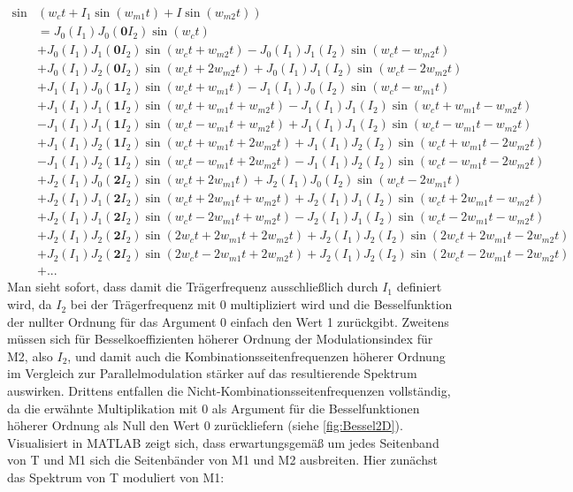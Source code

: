 \begin{equation}
\begin{split}
\sin&(w_ct + I_1\sin(w_{m1}t) + I\sin(w_{m2}t)) \\
&= J_0(I_1)J_0(\mathbf{0}I_2)\sin(w_ct) \\
&+ J_0(I_1)J_1(\mathbf{0}I_2)\sin(w_ct + w_{m2}t) - J_0(I_1)J_1(I_2)\sin(w_ct - w_{m2}t) \\
&+ J_0(I_1)J_2(\mathbf{0}I_2)\sin(w_ct + 2w_{m2}t) + J_0(I_1)J_1(I_2)\sin(w_ct - 2w_{m2}t) \\
&+ J_1(I_1)J_0(\mathbf{1}I_2)\sin(w_ct + w_{m1}t) - J_1(I_1)J_0(I_2)\sin(w_ct - w_{m1}t) \\
&+ J_1(I_1)J_1(\mathbf{1}I_2)\sin(w_ct + w_{m1}t + w_{m2}t) - J_1(I_1)J_1(I_2)\sin(w_ct + w_{m1}t - w_{m2}t) \\
&- J_1(I_1)J_1(\mathbf{1}I_2)\sin(w_ct - w_{m1}t + w_{m2}t) + J_1(I_1)J_1(I_2)\sin(w_ct - w_{m1}t - w_{m2}t) \\
&+ J_1(I_1)J_2(\mathbf{1}I_2)\sin(w_ct + w_{m1}t + 2w_{m2}t) + J_1(I_1)J_2(I_2)\sin(w_ct + w_{m1}t - 2w_{m2}t) \\
&- J_1(I_1)J_2(\mathbf{1}I_2)\sin(w_ct - w_{m1}t + 2w_{m2}t) - J_1(I_1)J_2(I_2)\sin(w_ct - w_{m1}t - 2w_{m2}t) \\
&+ J_2(I_1)J_0(\mathbf{2}I_2)\sin(w_ct + 2w_{m1}t) + J_2(I_1)J_0(I_2)\sin(w_ct - 2w_{m1}t) \\
&+ J_2(I_1)J_1(\mathbf{2}I_2)\sin(w_ct + 2w_{m1}t + w_{m2}t) + J_2(I_1)J_1(I_2)\sin(w_ct + 2w_{m1}t - w_{m2}t) \\
&+ J_2(I_1)J_1(\mathbf{2}I_2)\sin(w_ct - 2w_{m1}t + w_{m2}t) - J_2(I_1)J_1(I_2)\sin(w_ct - 2w_{m1}t - w_{m2}t) \\
&+ J_2(I_1)J_2(\mathbf{2}I_2)\sin(2w_ct + 2w_{m1}t + 2w_{m2}t) + J_2(I_1)J_2(I_2)\sin(2w_ct + 2w_{m1}t - 2w_{m2}t) \\
&+ J_2(I_1)J_2(\mathbf{2}I_2)\sin(2w_ct - 2w_{m1}t + 2w_{m2}t) + J_2(I_1)J_2(I_2)\sin(2w_ct - 2w_{m1}t - 2w_{m2}t) \\
&+ ... 
\end{split}
\end{equation}
Man sieht sofort, dass damit die Trägerfrequenz ausschließlich durch $ I_1 $ definiert wird, da $ I_2 $ bei der Trägerfrequenz mit 0 multipliziert wird und die Besselfunktion der nullter Ordnung für das Argument 0 einfach den Wert 1 zurückgibt. Zweitens müssen sich für Besselkoeffizienten höherer Ordnung der Modulationsindex für M2, also $ I_2 $, und damit auch die Kombinationsseitenfrequenzen höherer Ordnung im Vergleich zur Parallelmodulation stärker auf das resultierende Spektrum auswirken. Drittens entfallen die Nicht-Kombinationsseitenfrequenzen vollständig, da die erwähnte Multiplikation mit 0 als Argument für die Besselfunktionen höherer Ordnung als Null den Wert 0 zurückliefern (siehe \ref{fig:Bessel2D}). Visualisiert in MATLAB zeigt sich, dass erwartungsgemäß um jedes Seitenband von T und M1 sich die Seitenbänder von M1 und M2 ausbreiten. Hier zunächst das Spektrum von T moduliert von M1:

